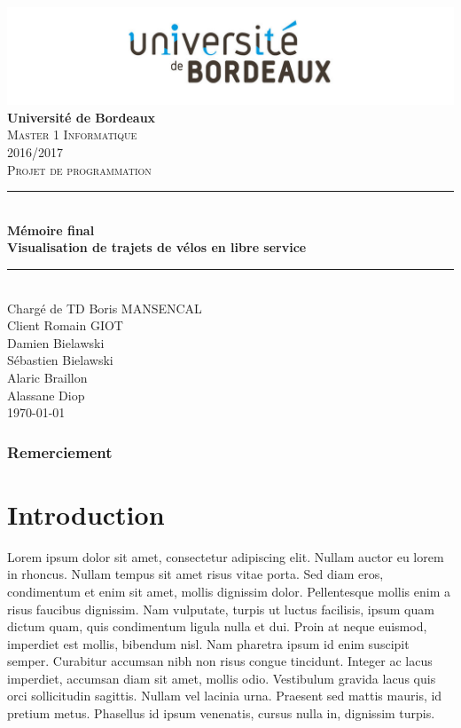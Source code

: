 \documentclass[12pt]{article}
\begin{document}
	\begin{titlepage}
		\includegraphics[scale=0.2]{logo_bordeaux.png}\\
		\centering
		\linebreak
		{\LARGE \bfseries Université de Bordeaux}\\ [2cm]
		\textsc{\Large Master 1 Informatique}\\ [0,3cm]
		\textsc{\Large 2016/2017}\\ [1,4cm]

		\textsc{\Large Projet de programmation}\\ [1.4cm]

		\rule{16cm}{1mm}\\ [0,7cm]
		{\huge \bfseries Mémoire final}\\ [0,5cm]
		{\huge \bfseries Visualisation de trajets de vélos en libre service} \\[0,7cm]
		\rule{16cm}{1mm}\\ [1cm]

		{\Large Chargé de TD Boris MANSENCAL }\\ [0,3cm]
		{\Large Client Romain GIOT }\\ [1cm]

		{\Large Damien Bielawski }\\ [0,3cm]
		{\Large Sébastien Bielawski }\\[0,3cm]
		{\Large Alaric Braillon }\\ [0,3cm]
		{\Large Alassane Diop }\\ [2cm]
		\Large\today

	\end{titlepage}

 
\tableofcontents \newpage

\section*{Remerciement} \newpage

\part{Introduction}
Lorem ipsum dolor sit amet, consectetur adipiscing elit. Nullam auctor eu lorem in rhoncus. Nullam tempus sit amet risus vitae porta. Sed diam eros, condimentum et enim sit amet, mollis dignissim dolor. Pellentesque mollis enim a risus faucibus dignissim. Nam vulputate, turpis ut luctus facilisis, ipsum quam dictum quam, quis condimentum ligula nulla et dui. Proin at neque euismod, imperdiet est mollis, bibendum nisl. Nam pharetra ipsum id enim suscipit semper. Curabitur accumsan nibh non risus congue tincidunt. Integer ac lacus imperdiet, accumsan diam sit amet, mollis odio. Vestibulum gravida lacus quis orci sollicitudin sagittis. Nullam vel lacinia urna. Praesent sed mattis mauris, id pretium metus. Phasellus id ipsum venenatis, cursus nulla in, dignissim turpis.
\end{document}
